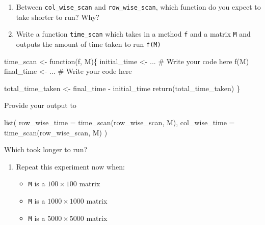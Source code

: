 \documentclass[
  letterpaper,
  DIV=11,
  numbers=noendperiod]{scrartcl}
\newenvironment{Shaded}{\begin{snugshade}}{\end{snugshade}}
\newcommand{\AttributeTok}[1]{\textcolor[rgb]{0.40,0.45,0.13}{#1}}
\newcommand{\CommentTok}[1]{\textcolor[rgb]{0.37,0.37,0.37}{#1}}
\newcommand{\ControlFlowTok}[1]{\textcolor[rgb]{0.00,0.23,0.31}{#1}}
\newcommand{\FunctionTok}[1]{\textcolor[rgb]{0.28,0.35,0.67}{#1}}
\newcommand{\NormalTok}[1]{\textcolor[rgb]{0.00,0.23,0.31}{#1}}
\newcommand{\OtherTok}[1]{\textcolor[rgb]{0.00,0.23,0.31}{#1}}
\newcommand{\SpecialCharTok}[1]{\textcolor[rgb]{0.37,0.37,0.37}{#1}}
\providecommand{\tightlist}{%
  \setlength{\itemsep}{0pt}\setlength{\parskip}{0pt}}\usepackage{longtable,booktabs,array}
\begin{document}
\begin{enumerate}
\def\labelenumi{\arabic{enumi}.}
\setcounter{enumi}{3}
\item
  Between \texttt{col\_wise\_scan} and \texttt{row\_wise\_scan}, which
  function do you expect to take shorter to run? Why?
\item
  Write a function \texttt{time\_scan} which takes in a method
  \texttt{f} and a matrix \texttt{M} and outputs the amount of time
  taken to run \texttt{f(M)}
\end{enumerate}

\begin{Shaded}
\begin{Highlighting}[]
\NormalTok{time\_scan }\OtherTok{\textless{}{-}} \ControlFlowTok{function}\NormalTok{(f, M)\{}
\NormalTok{    initial\_time }\OtherTok{\textless{}{-}}\NormalTok{ ... }\CommentTok{\# Write your code here}
    \FunctionTok{f}\NormalTok{(M)}
\NormalTok{    final\_time }\OtherTok{\textless{}{-}}\NormalTok{ ...  }\CommentTok{\# Write your code here}
    
\NormalTok{    total\_time\_taken }\OtherTok{\textless{}{-}}\NormalTok{ final\_time }\SpecialCharTok{{-}}\NormalTok{ initial\_time}
    \FunctionTok{return}\NormalTok{(total\_time\_taken)}
\NormalTok{\}}
\end{Highlighting}
\end{Shaded}

Provide your output to

\begin{Shaded}
\begin{Highlighting}[]
\FunctionTok{list}\NormalTok{(}
    \AttributeTok{row\_wise\_time =} \FunctionTok{time\_scan}\NormalTok{(row\_wise\_scan, M),}
    \AttributeTok{col\_wise\_time =} \FunctionTok{time\_scan}\NormalTok{(row\_wise\_scan, M)}
\NormalTok{)}
\end{Highlighting}
\end{Shaded}

Which took longer to run?

\begin{enumerate}
\def\labelenumi{\arabic{enumi}.}
\setcounter{enumi}{5}
\tightlist
\item
  Repeat this experiment now when:

  \begin{itemize}
  \tightlist
  \item
    \texttt{M} is a \(100 \times 100\) matrix
  \item
    \texttt{M} is a \(1000 \times 1000\) matrix
  \item
    \texttt{M} is a \(5000 \times 5000\) matrix
  \end{itemize}
\end{enumerate}
\end{document}
